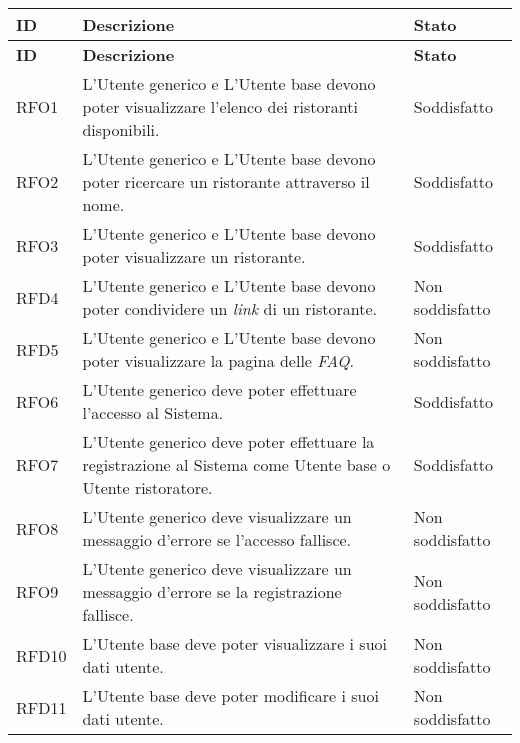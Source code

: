 \begin{longtable}{|l|p{}|p{3cm}|}
	\hline
	\textbf{ID} & \textbf{Descrizione}                                                                                                    & \textbf{Stato}  \\
	\endfirsthead
	\hline
	\textbf{ID} & \textbf{Descrizione}                                                                                                    & \textbf{Stato}  \\
	\hline
	\endhead
	\hline
	RFO1        & L'Utente generico e L'Utente base devono poter visualizzare l'elenco dei ristoranti disponibili.                        & Soddisfatto \\
	\hline
	RFO2        & L'Utente generico e L'Utente base devono poter ricercare un ristorante attraverso il nome.               				  & Soddisfatto \\
	\hline
	RFO3        & L'Utente generico e L'Utente base devono poter visualizzare un ristorante.                                              & Soddisfatto \\
	\hline
	RFD4        & L'Utente generico e L'Utente base devono poter condividere un \textit{link} di un ristorante.                           & Non soddisfatto \\
	\hline
	RFD5        & L'Utente generico e L'Utente base devono poter visualizzare la pagina delle  \textit{FAQ\g}.                            & Non soddisfatto \\
	\hline
	RFO6        & L'Utente generico deve poter effettuare l'accesso al Sistema.                                                           & Soddisfatto \\
	\hline
	RFO7        & L'Utente generico deve poter effettuare la registrazione al Sistema come Utente base o Utente ristoratore.              & Soddisfatto \\
	\hline
	RFO8        & L'Utente generico deve visualizzare un messaggio d'errore se l'accesso fallisce.                                        & Non soddisfatto \\
	\hline
	RFO9        & L'Utente generico deve visualizzare un messaggio d'errore se la registrazione fallisce.                                 & Non soddisfatto \\
	\hline
	RFD10       & L'Utente base deve poter visualizzare i suoi dati utente.                                                               & Non soddisfatto \\
	\hline
	RFD11       & L'Utente base deve poter modificare i suoi dati utente.                                                                 & Non soddisfatto \\

\end{longtable}
